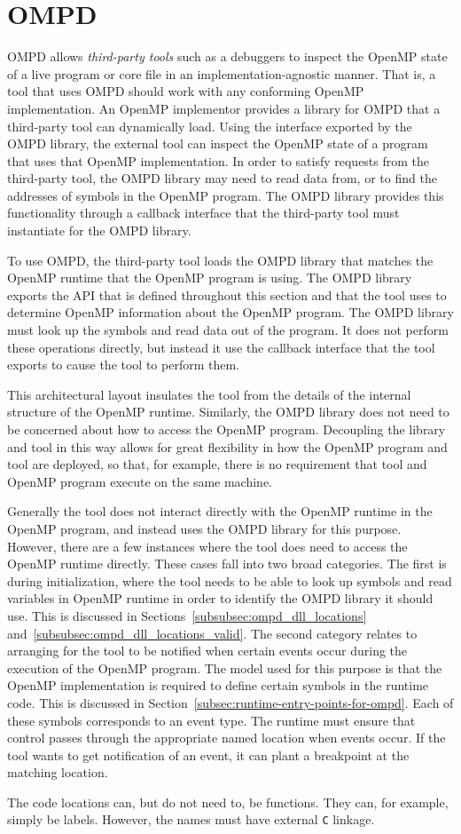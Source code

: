 \section{OMPD}
\label{sec:ompd-overview}
\label{sec:third-party-tool-callback-interface}

OMPD allows \emph{third-party tools} such as a debuggers to inspect the 
OpenMP state of a live program or core file in an implementation-agnostic 
manner. That is, a tool that uses OMPD should work with any conforming 
OpenMP implementation. An OpenMP implementor provides a library for OMPD 
that a third-party tool can dynamically load. Using the interface exported 
by the OMPD library, the external tool can inspect the OpenMP state of a 
program that uses that OpenMP implementation. In order to satisfy requests 
from the third-party tool, the OMPD library may need to read data from, or 
to find the addresses of symbols in the OpenMP program. The OMPD library 
provides this functionality through a callback interface that the third-party
tool must instantiate for the OMPD library.

To use OMPD, the third-party tool loads the OMPD library that matches the 
OpenMP runtime that the OpenMP program is using. The OMPD library exports 
the API that is defined throughout this section and that the tool uses to 
determine OpenMP information about the OpenMP program. The OMPD library must
look up the symbols and read data out of the program. It does not perform
these operations directly, but instead it use the callback interface that the
tool exports to cause the tool to perform them.

This architectural layout insulates the tool from the details
of the internal structure of the OpenMP runtime.
Similarly, the OMPD library does not need to be concerned about
how to access the OpenMP program.
Decoupling the library and tool in this way allows for
great flexibility in how the OpenMP program and tool are deployed,
so that, for example, there is no requirement that tool
and OpenMP program execute on the same machine.

Generally the tool does not interact directly with the OpenMP
runtime in the OpenMP program, and instead uses the OMPD library
for this purpose.
However, there are a few instances where the tool does need
to access the OpenMP runtime directly.
These cases fall into two broad categories.
The first is during initialization, where the tool needs
to be able to look up symbols and read variables in OpenMP runtime
in order to identify the OMPD library it should use.
This is discussed in Sections~\ref{subsubsec:ompd_dll_locations}
and~\ref{subsubsec:ompd_dll_locations_valid}.
The second category relates to arranging for the tool to be notified
when certain events occur during the execution of the OpenMP program.
The model used for this purpose is that the OpenMP implementation
is required to define certain symbols in the runtime code.
This is discussed in Section~\ref{subsec:runtime-entry-points-for-ompd}.
Each of these symbols corresponds to an event type.
The runtime must ensure that control passes through the appropriate
named location when events occur.
If the tool wants to get notification of an event, it can plant
a breakpoint at the matching location.

The code locations can, but do not need to, be functions.
They can, for example, simply be labels.
However, the names must have external \texttt{C} linkage.

